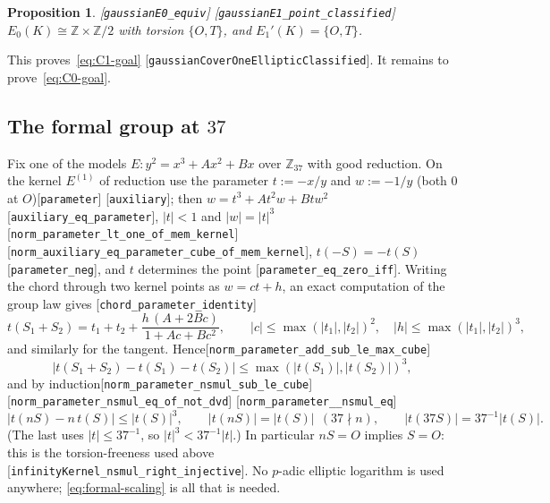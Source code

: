 \documentclass[10pt]{article}
\newtheorem{proposition}[theorem]{Proposition}
\theoremstyle{definition}
\theoremstyle{remark}
\newcommand{\Z}{\mathbb{Z}}
\newcommand{\Oinf}{O}
\newcommand{\leanref}[1]{{\scriptsize\textup{[\texttt{#1}]}}\allowbreak}
\begin{document}
\begin{proposition}\label{prop:groups}
\leanref{gaussian\allowbreak E0\_\allowbreak equiv} \leanref{gaussian\allowbreak E1\_\allowbreak point\_\allowbreak classified}
$E_0(K)\cong\Z\times\Z/2$ with torsion $\{\Oinf,T\}$, and $E_1'(K)=\{\Oinf,T\}$.
\end{proposition}
This proves~\eqref{eq:C1-goal} \leanref{gaussian\allowbreak Cover\allowbreak One\allowbreak Elliptic\allowbreak Classified}.
It remains to prove~\eqref{eq:C0-goal}.

\subsection{The formal group at \texorpdfstring{$37$}{37}}\label{sec:formal}

Fix one of the models $E:y^2=x^3+Ax^2+Bx$ over $\Z_{37}$ with good reduction.
On the kernel $E^{(1)}$ of reduction use the parameter
$t:=-x/y$ and $w:=-1/y$ (both $0$ at $\Oinf$)\leanref{parameter} \leanref{auxiliary};
then $w=t^3+At^2w+Btw^2$\leanref{auxiliary\_\allowbreak eq\_\allowbreak parameter}, $|t|<1$ and
$|w|=|t|^3$\leanref{norm\_\allowbreak parameter\_\allowbreak lt\_\allowbreak one\_\allowbreak of\_\allowbreak mem\_\allowbreak kernel} \leanref{norm\_\allowbreak auxiliary\_\allowbreak eq\_\allowbreak parameter\_\allowbreak cube\_\allowbreak of\_\allowbreak mem\_\allowbreak kernel},
$t(-S)=-t(S)$\leanref{parameter\_\allowbreak neg}, and $t$ determines the point
\leanref{parameter\_\allowbreak eq\_\allowbreak zero\_\allowbreak iff}.  Writing the chord through two kernel points
as $w=ct+h$, an exact computation of the group law gives
\leanref{chord\_\allowbreak parameter\_\allowbreak identity}
\[
 t(S_1+S_2)=t_1+t_2+\frac{h\,(A+2Bc)}{1+Ac+Bc^2},\qquad
 |c|\le\max(|t_1|,|t_2|)^2,\quad |h|\le\max(|t_1|,|t_2|)^3 ,
\]
and similarly for the tangent.  Hence\leanref{norm\_\allowbreak parameter\_\allowbreak add\_\allowbreak sub\_\allowbreak le\_\allowbreak max\_\allowbreak cube}
\begin{equation}\label{eq:formal-estimate}
 |t(S_1+S_2)-t(S_1)-t(S_2)|\le\max(|t(S_1)|,|t(S_2)|)^3 ,
\end{equation}
and by induction\leanref{norm\_\allowbreak parameter\_\allowbreak nsmul\_\allowbreak sub\_\allowbreak le\_\allowbreak cube} \leanref{norm\_\allowbreak parameter\_\allowbreak nsmul\_\allowbreak eq\_\allowbreak of\_\allowbreak not\_\allowbreak dvd} \leanref{norm\_\allowbreak parameter\_\_\allowbreak nsmul\_\allowbreak eq}
\begin{equation}\label{eq:formal-scaling}
 |t(nS)-n\,t(S)|\le|t(S)|^3,\qquad
 |t(nS)|=|t(S)|\ \ (37\nmid n),\qquad
 |t(37S)|=37^{-1}|t(S)| .
\end{equation}
(The last uses $|t|\le37^{-1}$, so $|t|^3<37^{-1}|t|$.)  In particular
$nS=\Oinf$ implies $S=\Oinf$: this is the torsion-freeness used above
\leanref{infinity\allowbreak Kernel\_\allowbreak nsmul\_\allowbreak right\_\allowbreak injective}.  No $p$-adic elliptic
logarithm is used anywhere; \eqref{eq:formal-scaling} is all that is needed.
\end{document}
